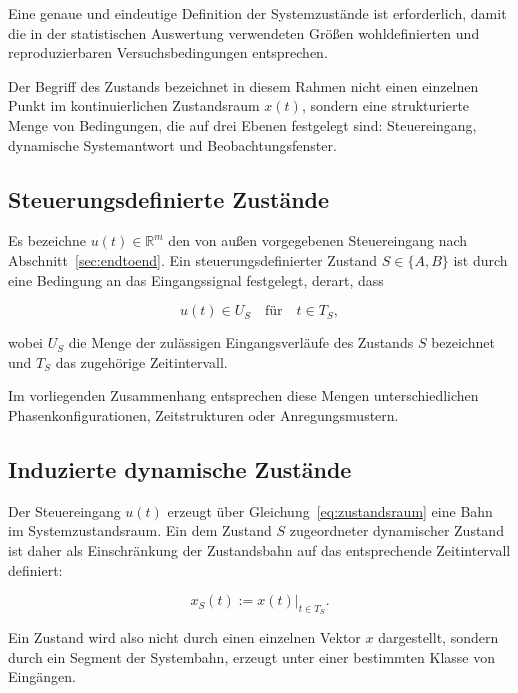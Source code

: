 \documentclass[12pt,a4paper]{report}
\begin{document}
Eine genaue und eindeutige Definition der Systemzustände ist erforderlich,
damit die in der statistischen Auswertung verwendeten Größen
wohldefinierten und reproduzierbaren Versuchsbedingungen entsprechen.

Der Begriff des Zustands bezeichnet in diesem Rahmen nicht einen einzelnen
Punkt im kontinuierlichen Zustandsraum $x(t)$, sondern eine strukturierte
Menge von Bedingungen, die auf drei Ebenen festgelegt sind: Steuereingang,
dynamische Systemantwort und Beobachtungsfenster.

\subsection{Steuerungsdefinierte Zustände}

Es bezeichne $u(t) \in \mathbb{R}^{m}$ den von außen vorgegebenen
Steuereingang nach Abschnitt~\ref{sec:endtoend}. Ein steuerungsdefinierter
Zustand $S \in \{A, B\}$ ist durch eine Bedingung an das Eingangssignal
festgelegt, derart, dass

\begin{equation}
u(t) \in U_S \quad \text{für} \quad t \in T_S,
\label{eq:steuerzustand}
\end{equation}

wobei $U_S$ die Menge der zulässigen Eingangsverläufe des Zustands $S$
bezeichnet und $T_S$ das zugehörige Zeitintervall.

Im vorliegenden Zusammenhang entsprechen diese Mengen unterschiedlichen
Phasenkonfigurationen, Zeitstrukturen oder Anregungsmustern.

\subsection{Induzierte dynamische Zustände}

Der Steuereingang $u(t)$ erzeugt über
Gleichung~\eqref{eq:zustandsraum} eine Bahn im Systemzustandsraum. Ein
dem Zustand $S$ zugeordneter dynamischer Zustand ist daher als
Einschränkung der Zustandsbahn auf das entsprechende Zeitintervall
definiert:

\begin{equation}
x_S(t) := x(t)\big|_{t \in T_S}.
\label{eq:dynzustand}
\end{equation}

Ein Zustand wird also nicht durch einen einzelnen Vektor $x$ dargestellt,
sondern durch ein Segment der Systembahn, erzeugt unter einer bestimmten
Klasse von Eingängen.
\end{document}
